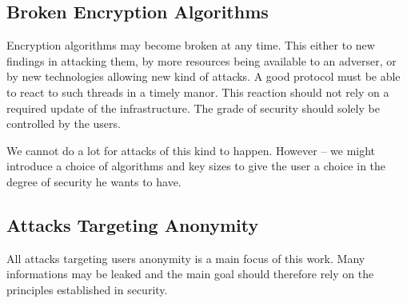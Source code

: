 \subsection{Broken Encryption Algorithms}
Encryption algorithms may become broken at any time. This either to new findings in attacking them, by more resources being available to an adverser, or by new technologies allowing new kind of attacks. A good protocol must be able to react to such threads in a timely manor. This reaction should not rely on a required update of the infrastructure. The grade of security should solely be controlled by the users. 

We cannot do a lot for attacks of this kind to happen. However -- we might introduce a choice of algorithms and key sizes to give the user a choice in the degree of security he wants to have.

\subsection{Attacks Targeting Anonymity}
All attacks targeting users anonymity is a main focus of this work. Many informations may be leaked and the main goal should therefore rely on the principles established in security.

